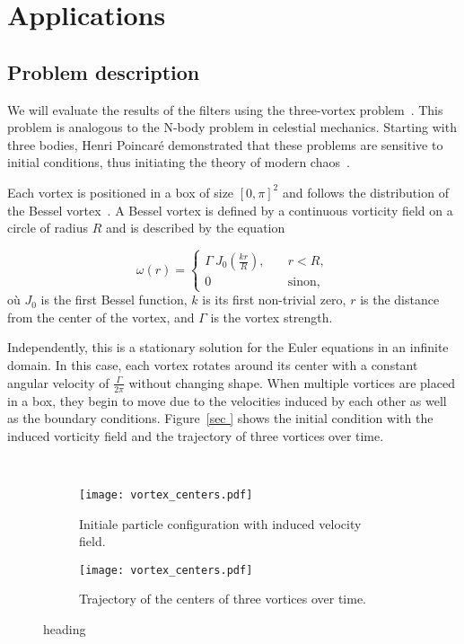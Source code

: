 
\section{Applications}

\subsection*{Problem description}

We will evaluate the results of the filters using the three-vortex problem~\cite{aref_motion_1979,yim_motion_2022}. This problem is analogous to the N-body problem in celestial mechanics. Starting with three bodies, Henri Poincaré demonstrated that these problems are sensitive to initial conditions, thus initiating the theory of modern chaos~\cite{poincare1890,diacu1996}.

Each vortex is positioned in a box of size $[0, \pi]^2$ and follows the distribution of the Bessel vortex~\cite{vanGeffen1996}. A Bessel vortex is defined by a continuous vorticity field on a circle of radius $R$ and is described by the equation

\begin{equation*}
    \omega(r) =  \begin{cases}
        \Gamma ~ J_0\left(\frac{k  r}{ R}\right),   \quad & r < R,        \\
        0 \quad                                           & \text{sinon},
    \end{cases}
\end{equation*}où $J_0$ is the first Bessel function, $k$ is its first non-trivial zero, $r$ is the distance from the center of the vortex, and $\Gamma$ is the vortex strength.

Independently, this is a stationary solution for the Euler equations in an infinite domain. In this case, each vortex rotates around its center with a constant angular velocity of $\frac{\Gamma}{2\pi}$ without changing shape. When multiple vortices are placed in a box, they begin to move due to the velocities induced by each other as well as the boundary conditions. Figure~\ref{sec
} shows the initial condition with the induced vorticity field and the trajectory of three vortices over time.

\begin{figure}~\label{sec
    }
    \centering
    \begin{subfigure}{0.5\textwidth}
        \texttt{[image: vortex\_centers.pdf]}
        \caption{Initiale particle configuration with induced velocity field.}
    \end{subfigure}
    \begin{subfigure}{0.5\textwidth}
        \texttt{[image: vortex\_centers.pdf]}
        \caption{Trajectory of the centers of three vortices over time.}
    \end{subfigure}
    \caption*{heading}
\end{figure}

